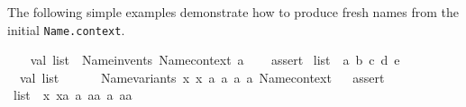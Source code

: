 \begin{isabellebody}
\begin{isamarkuptext}
\begin{description}
  \end{description}%
\end{isamarkuptext}%
\isamarkuptrue%
%
\endisatagmlref
{\isafoldmlref}%
%
\isadelimmlref
%
\endisadelimmlref
%
\isadelimmlex
%
\endisadelimmlex
%
\isatagmlex
%
\begin{isamarkuptext}%
The following simple examples demonstrate how to produce
  fresh names from the initial \verb|Name.context|.%
\end{isamarkuptext}%
\isamarkuptrue%
%
\endisatagmlex
{\isafoldmlex}%
%
\isadelimmlex
%
\endisadelimmlex
%
\isadelimML
%
\endisadelimML
%
\isatagML
{}\isamarkupfalse%
\ {\isacharverbatimopen}\isanewline
\ \ val\ list{}\ {\isacharequal}\ Name{\isachardot}invents\ Name{\isachardot}context\ {\isachardoublequote}a{\isachardoublequote}\ {}{\isacharsemicolon}\isanewline
\ \ %
\isaantiq
assert%
\endisaantiq
\ {\isacharparenleft}list{}\ {\isacharequal}\ {\isacharbrackleft}{\isachardoublequote}a{\isachardoublequote}{\isacharcomma}\ {\isachardoublequote}b{\isachardoublequote}{\isacharcomma}\ {\isachardoublequote}c{\isachardoublequote}{\isacharcomma}\ {\isachardoublequote}d{\isachardoublequote}{\isacharcomma}\ {\isachardoublequote}e{\isachardoublequote}{\isacharbrackright}{\isacharparenright}{\isacharsemicolon}\isanewline
\isanewline
\ \ val\ list{}\ {\isacharequal}\isanewline
\ \ \ \ {\isacharhash}{}\ {\isacharparenleft}Name{\isachardot}variants\ {\isacharbrackleft}{\isachardoublequote}x{\isachardoublequote}{\isacharcomma}\ {\isachardoublequote}x{\isachardoublequote}{\isacharcomma}\ {\isachardoublequote}a{\isachardoublequote}{\isacharcomma}\ {\isachardoublequote}a{\isachardoublequote}{\isacharcomma}\ {\isachardoublequote}{\isacharprime}a{\isachardoublequote}{\isacharcomma}\ {\isachardoublequote}{\isacharprime}a{\isachardoublequote}{\isacharbrackright}\ Name{\isachardot}context{\isacharparenright}{\isacharsemicolon}\isanewline
\ \ %
\isaantiq
assert%
\endisaantiq
\ {\isacharparenleft}list{}\ {\isacharequal}\ {\isacharbrackleft}{\isachardoublequote}x{\isachardoublequote}{\isacharcomma}\ {\isachardoublequote}xa{\isachardoublequote}{\isacharcomma}\ {\isachardoublequote}a{\isachardoublequote}{\isacharcomma}\ {\isachardoublequote}aa{\isachardoublequote}{\isacharcomma}\ {\isachardoublequote}{\isacharprime}a{\isachardoublequote}{\isacharcomma}\ {\isachardoublequote}{\isacharprime}aa{\isachardoublequote}{\isacharbrackright}{\isacharparenright}{\isacharsemicolon}\isanewline
{\isacharverbatimclose}%
\endisatagML
{\isafoldML}%

\end{isabellebody}
